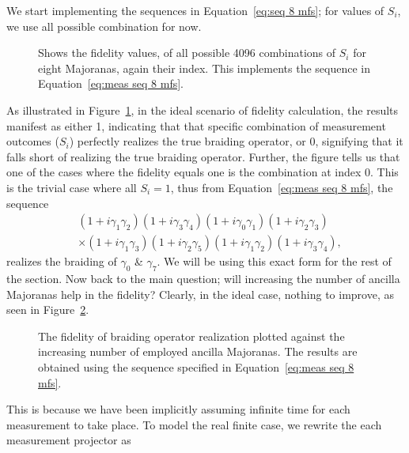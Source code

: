 \documentclass{article}
\begin{document}
\vspace{12pt}
We start implementing the sequences in Equation~\ref{eq:seq 8 mfs}; for values of $ S_i $, we use all possible combination for now.
\begin{figure}
	\begin{center}
		
	\end{center}
	\caption{Shows the fidelity values, of all possible 4096 combinations of $ S_i $ for eight Majoranas, again their index. This implements the sequence in Equation~\ref{eq:meas seq 8 mfs}.}
	\label{fig:ideal fids all combs}
\end{figure}
As illustrated in Figure~\ref{fig:ideal fids all combs}, in the ideal scenario of fidelity calculation, the results manifest as either 1, indicating that that specific combination of measurement outcomes ($ S_i $) perfectly realizes the true braiding operator, or 0, signifying that it falls short of realizing the true braiding operator. Further, the figure tells us that one of the cases where the fidelity equals one is the combination at index 0. This is the trivial case where all $ S_i=1 $, thus from Equation~\ref{eq:meas seq 8 mfs}, the sequence
\[
	\begin{aligned}
		 & (1+ i \gamma_1 \gamma_2)(1+ i \gamma_3 \gamma_4)(1+ i \gamma_0 \gamma_1) (1+ i \gamma_2 \gamma_3)        \\
		 & \times (1+ i \gamma_1 \gamma_3)(1+ i \gamma_2 \gamma_5)(1+ i \gamma_1 \gamma_2)(1+ i \gamma_3 \gamma_4),
	\end{aligned}
\]
realizes the braiding of $ \gamma_0 $ \& $ \gamma_7 $. We will be using this exact form for the rest of the section. Now back to the main question; will increasing the number of ancilla Majoranas help in the fidelity? Clearly, in the ideal case, nothing to improve, as seen in Figure~\ref{fig:fid vs N ideal}.
\begin{figure}
	\begin{center}
		
	\end{center}
	\caption{The fidelity of braiding operator realization plotted against the increasing number of employed ancilla Majoranas. The results are obtained using the sequence specified in Equation~\ref{eq:meas seq 8 mfs}.}
	\label{fig:fid vs N ideal}
\end{figure}
This is because we have been implicitly assuming infinite time for each measurement to take place. To model the real finite case, we rewrite the each measurement projector as
\end{document}
